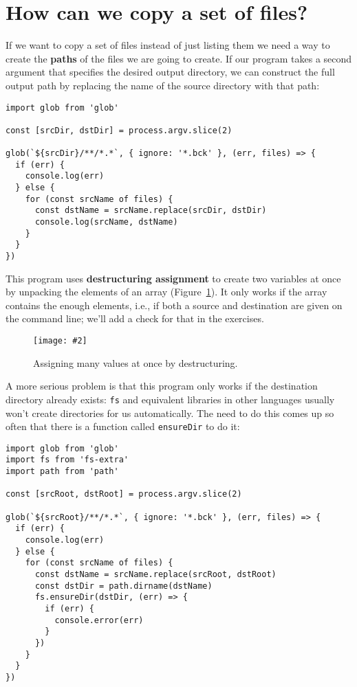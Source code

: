 \documentclass[krantzl]{krantz}
\newcommand{\figpdf}[4]{\begin{figure}%
\centering%
\texttt{[image: \#2]}%
\caption{#3}%
\label{#1}%
\end{figure}}
\newcommand{\figref}[1]{Figure~\ref{#1}}
\newcommand{\glossref}[1]{\textbf{#1}}
\begin{document}
\section{How can we copy a set of files?}\label{systems-programming-copy}


If we want to copy a set of files instead of just listing them
we need a way to create the \glossref{paths} of the files we are going to create.
If our program takes a second argument that specifies the desired output directory,
we can construct the full output path by replacing the name of the source directory with that path:


\begin{lstlisting}[frame=tblr]
import glob from 'glob'

const [srcDir, dstDir] = process.argv.slice(2)

glob(`${srcDir}/**/*.*`, { ignore: '*.bck' }, (err, files) => {
  if (err) {
    console.log(err)
  } else {
    for (const srcName of files) {
      const dstName = srcName.replace(srcDir, dstDir)
      console.log(srcName, dstName)
    }
  }
})
\end{lstlisting}



\noindent This program uses \glossref{destructuring assignment}
to create two variables at once
by unpacking the elements of an array
(\figref{systems-programming-destructuring-assignment}).
It only works if the array contains the enough elements,
i.e.,
if both a source and destination are given on the command line;
we’ll add a check for that in the exercises.

\figpdf{systems-programming-destructuring-assignment}{./systems-programming/destructuring-assignment.pdf}{Assigning many values at once by destructuring.}{0.6}


A more serious problem is that
this program only works if the destination directory already exists:
\texttt{fs} and equivalent libraries in other languages usually won’t create directories for us automatically.
The need to do this comes up so often that there is a function called \texttt{ensureDir} to do it:


\begin{lstlisting}[frame=tblr]
import glob from 'glob'
import fs from 'fs-extra'
import path from 'path'

const [srcRoot, dstRoot] = process.argv.slice(2)

glob(`${srcRoot}/**/*.*`, { ignore: '*.bck' }, (err, files) => {
  if (err) {
    console.log(err)
  } else {
    for (const srcName of files) {
      const dstName = srcName.replace(srcRoot, dstRoot)
      const dstDir = path.dirname(dstName)
      fs.ensureDir(dstDir, (err) => {
        if (err) {
          console.error(err)
        }
      })
    }
  }
})
\end{lstlisting}
\end{document}
